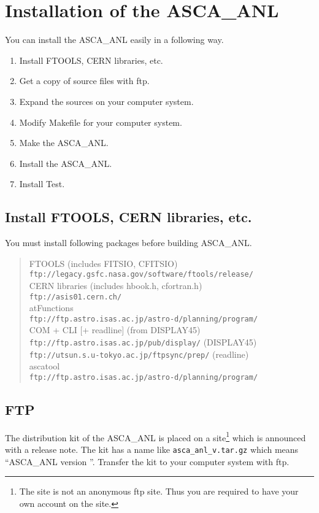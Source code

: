 \chapter{Installation of the ASCA\_ANL}
\label{sec:install}
You can install the ASCA\_ANL easily in a following way.
\begin{enumerate}
  \item Install FTOOLS, CERN libraries, etc.
  \item Get a copy of source files with ftp.
  \item Expand the sources on your computer system.
  \item Modify Makefile for your computer system.
  \item Make the ASCA\_ANL.
  \item Install the ASCA\_ANL.
  \item Install Test.
\end{enumerate}

\section{Install FTOOLS, CERN libraries, etc.}
You must install following packages before building ASCA\_ANL.\\
\begin{quote}
FTOOLS (includes FITSIO, CFITSIO)\\
	{\tt ftp://legacy.gsfc.nasa.gov/software/ftools/release/} \\

CERN libraries (includes hbook.h, cfortran.h)\\
	{\tt ftp://asis01.cern.ch/} \\

atFunctions\\
	{\tt ftp://ftp.astro.isas.ac.jp/astro-d/planning/program/} \\

COM + CLI [+ readline] (from DISPLAY45)\\
	{\tt ftp://ftp.astro.isas.ac.jp/pub/display/} (DISPLAY45) \\
	{\tt ftp://utsun.s.u-tokyo.ac.jp/ftpsync/prep/} (readline) \\

ascatool\\
	{\tt ftp://ftp.astro.isas.ac.jp/astro-d/planning/program/} \\
\end{quote}

\section{FTP}
The distribution kit of the ASCA\_ANL is placed on a site\footnote{
The site is not an anonymous ftp site.
Thus you are required to have your own account on the site.
}
which is announced with a release note.
The kit has a name like {\tt asca\_anl\_v\ANLversion .tar.gz}
which means ``ASCA\_ANL version \ANLversion''.
Transfer the kit to your computer system with ftp.

